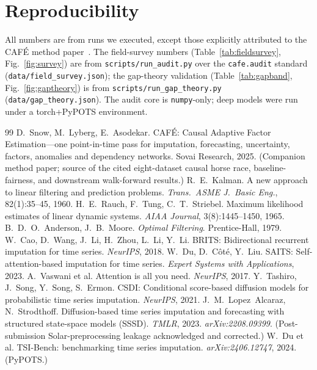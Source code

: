 \documentclass[10pt,twocolumn]{article}
\newcommand{\cafe}{CAF\'E}
\begin{document}
\section*{Reproducibility}
All numbers are from runs we executed, except those explicitly attributed to the
\cafe{} method paper~\cite{snow2025cafe}. The field-survey numbers
(Table~\ref{tab:fieldsurvey}, Fig.~\ref{fig:survey}) are from
\texttt{scripts/run\_audit.py} over the \texttt{cafe.audit} standard
(\texttt{data/field\_survey.json}); the gap-theory validation
(Table~\ref{tab:gapband}, Fig.~\ref{fig:gaptheory}) is from
\texttt{scripts/run\_gap\_theory.py} (\texttt{data/gap\_theory.json}). The audit
core is \texttt{numpy}-only; deep models were run under a torch+PyPOTS
environment.

\begin{thebibliography}{99}\small\setlength{\itemsep}{0pt}
 D.~Snow, M.~Lyberg, E.~Asodekar. \cafe{}: Causal Adaptive
Factor Estimation---one point-in-time pass for imputation, forecasting,
uncertainty, factors, anomalies and dependency networks. Sovai Research, 2025.
(Companion method paper; source of the cited eight-dataset causal horse race,
baseline-fairness, and downstream walk-forward results.)
 R.~E.~Kalman. A new approach to linear filtering and
prediction problems. \emph{Trans.\ ASME J.\ Basic Eng.}, 82(1):35--45, 1960.
 H.~E.~Rauch, F.~Tung, C.~T.~Striebel. Maximum likelihood
estimates of linear dynamic systems. \emph{AIAA Journal}, 3(8):1445--1450, 1965.
 B.~D.~O.~Anderson, J.~B.~Moore. \emph{Optimal
Filtering}. Prentice-Hall, 1979.
 W.~Cao, D.~Wang, J.~Li, H.~Zhou, L.~Li, Y.~Li. BRITS:
Bidirectional recurrent imputation for time series. \emph{NeurIPS}, 2018.
 W.~Du, D.~C\^ot\'e, Y.~Liu. SAITS: Self-attention-based
imputation for time series. \emph{Expert Systems with Applications}, 2023.
 A.~Vaswani et al. Attention is all you need.
\emph{NeurIPS}, 2017.
 Y.~Tashiro, J.~Song, Y.~Song, S.~Ermon. CSDI: Conditional
score-based diffusion models for probabilistic time series imputation.
\emph{NeurIPS}, 2021.
 J.~M.~Lopez~Alcaraz, N.~Strodthoff. Diffusion-based time series
imputation and forecasting with structured state-space models (SSSD).
\emph{TMLR}, 2023. \emph{arXiv:2208.09399}. (Post-submission Solar-preprocessing
leakage acknowledged and corrected.)
 W.~Du et al. TSI-Bench: benchmarking time series
imputation. \emph{arXiv:2406.12747}, 2024. (PyPOTS.)

\end{thebibliography}
\end{document}
